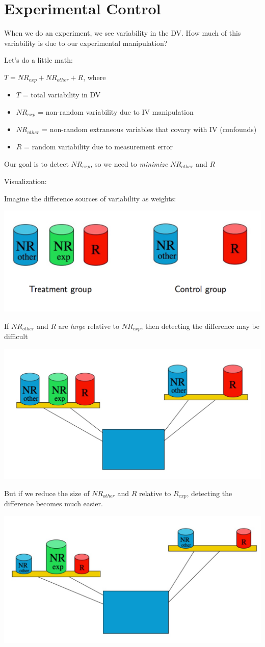 \documentclass[11pt]{article}
\begin{document}
\section*{Experimental Control}
\label{sec-2}

When we do an experiment, we see variability in the DV.  How much of this variability is due to our experimental manipulation?

Let's do a little math:

$T = NR_{exp} + NR_{other} + R$, where
\begin{itemize}
\item $T$ = total variability in DV
\item $NR_{exp}$ = non-random variability due to IV manipulation
\item $NR_{other}$ = non-random extraneous variables that covary with IV (confounds)
\item $R$ = random variability due to measurement error
\end{itemize}

Our goal is to detect $NR_{exp}$, so we need to \emph{minimize} $NR_{other}$ and $R$

Visualization:

Imagine the difference sources of variability as weights:

\includegraphics[width=.9\linewidth]{figures/weights.png}

If $NR_{other}$ and $R$ are \emph{large} relative to $NR_{exp}$, then detecting the difference may be difficult

\includegraphics[width=.9\linewidth]{figures/balance1.png}

But if we reduce the size of $NR_{other}$ and $R$ relative to $R_{exp}$, detecting the difference becomes much easier.

\includegraphics[width=.9\linewidth]{figures/balance2.png}
\end{document}
